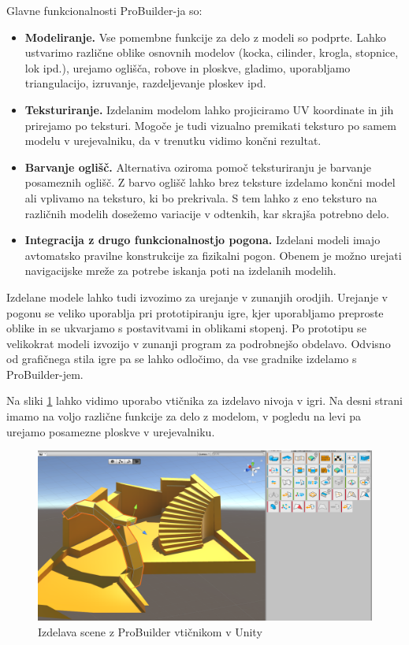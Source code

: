 \documentclass[12pt,a4paper,twoside]{book}
\begin{document}
Glavne funkcionalnosti ProBuilder-ja so:
\begin{itemize}
\item \textbf{Modeliranje.} Vse pomembne funkcije za delo z modeli so podprte. Lahko ustvarimo različne oblike osnovnih modelov (kocka, cilinder, krogla, stopnice, lok ipd.), urejamo oglišča, robove in ploskve, gladimo, uporabljamo triangulacijo, izruvanje, razdeljevanje ploskev ipd.
\item \textbf{Teksturiranje.} Izdelanim modelom lahko projiciramo UV koordinate in jih prirejamo po teksturi. Mogoče je tudi vizualno premikati teksturo po samem modelu v urejevalniku, da v trenutku vidimo končni rezultat.
\item \textbf{Barvanje oglišč.} Alternativa oziroma pomoč teksturiranju je barvanje posameznih oglišč. Z barvo oglišč lahko brez teksture izdelamo končni model ali vplivamo na teksturo, ki bo prekrivala. S tem lahko z eno teksturo na različnih modelih dosežemo variacije v odtenkih, kar skrajša potrebno delo.
\item \textbf{Integracija z drugo funkcionalnostjo pogona.} Izdelani modeli imajo avtomatsko pravilne konstrukcije za fizikalni pogon. Obenem je možno urejati navigacijske mreže za potrebe iskanja poti na izdelanih modelih.
\end{itemize}

Izdelane modele lahko tudi izvozimo za urejanje v zunanjih orodjih. Urejanje v pogonu se veliko uporablja pri prototipiranju igre, kjer uporabljamo preproste oblike in se ukvarjamo s postavitvami in oblikami stopenj. Po prototipu se velikokrat modeli izvozijo v zunanji program za podrobnejšo obdelavo. Odvisno od grafičnega stila igre pa se lahko odločimo, da vse gradnike izdelamo s ProBuilder-jem. 

Na sliki \ref{slika:probuilder} lahko vidimo uporabo vtičnika za izdelavo nivoja v igri. Na desni strani imamo na voljo različne funkcije za delo z modelom, v pogledu na levi pa urejamo posamezne ploskve v urejevalniku.

\begin{figure}[h]
	\centering
	\includegraphics[width=15cm]{probuilder}
	\caption{Izdelava scene z ProBuilder vtičnikom v Unity}
	\label{slika:probuilder}
\end{figure}
\end{document}
